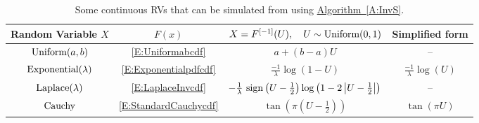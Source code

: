 \begin{table}[htpb]
\begin{center}
\caption{Some continuous RVs that can be simulated from using \hyperref[A:InvS]{Algorithm~\ref*{A:InvS}}. \label{T:ContinRVsInvS}}
\begin{tabular}{| c | c | c | c |}
\hline
Random Variable $X$ & $F(x)$ & $X=F^{[-1]}(U), \quad U \sim \mbox{{\rm Uniform}}(0,1)$ & Simplified form \\ \hline
$\mbox{{\rm Uniform}}(a,b)$ &
\eqref{E:Uniformabcdf} & $a+(b-a)U$ & -- \\
$\mbox{{\rm Exponential}}(\lambda)$ & \eqref{E:Exponentialpdfcdf} & $\frac{-1}{\lambda} \log(1-U)$ &  $\frac{-1}{\lambda} \log(U)$ \\
$\mbox{{\rm Laplace}}(\lambda)$ & \eqref{E:LaplaceInvcdf} & $- \frac{1}{\lambda} \ {\mathop{\rm sign}}\left( U-\frac{1}{2}\right) \log \left(1 - 2 \left| U-\frac{1}{2} \right| \right)$ & -- \\
$\mbox{{\rm Cauchy}}$ & \eqref{E:StandardCauchycdf} & $\tan \left(\pi \left(U- \frac{1}{2} \right) \right)$ & $\tan \left(\pi U \right)$ \\
\hline
\end{tabular}
\end{center}
\end{table}

